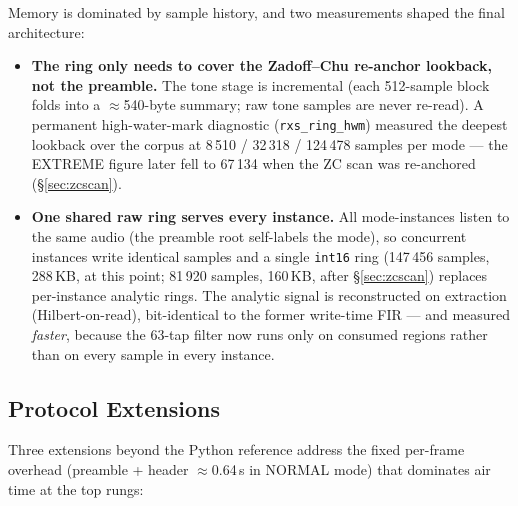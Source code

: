 Memory is dominated by sample history, and two measurements shaped the
final architecture:

\begin{itemize}
    \item \textbf{The ring only needs to cover the Zadoff--Chu
          re-anchor lookback, not the preamble.}  The tone stage is
          incremental (each 512-sample block folds into a
          $\approx$540-byte summary; raw tone samples are never
          re-read).  A permanent high-water-mark diagnostic
          (\texttt{rxs\_ring\_hwm}) measured the deepest lookback over
          the corpus at 8\,510 / 32\,318 / 124\,478 samples per mode
          --- the EXTREME figure later fell to 67\,134 when the ZC
          scan was re-anchored (\S\ref{sec:zcscan}).
    \item \textbf{One shared raw ring serves every instance.}  All
          mode-instances listen to the same audio (the preamble root
          self-labels the mode), so concurrent instances write
          identical samples and a single \texttt{int16} ring
          (147\,456 samples, 288\,KB, at this point; 81\,920 samples,
          160\,KB, after \S\ref{sec:zcscan}) replaces per-instance
          analytic rings.  The analytic signal is reconstructed on extraction
          (Hilbert-on-read), bit-identical to the former write-time
          FIR --- and measured \emph{faster}, because the 63-tap filter
          now runs only on consumed regions rather than on every
          sample in every instance.
\end{itemize}

\subsection{Protocol Extensions}
\label{sec:cport_proto}

Three extensions beyond the Python reference address the fixed
per-frame overhead (preamble + header $\approx$0.64\,s in NORMAL mode)
that dominates air time at the top rungs:

